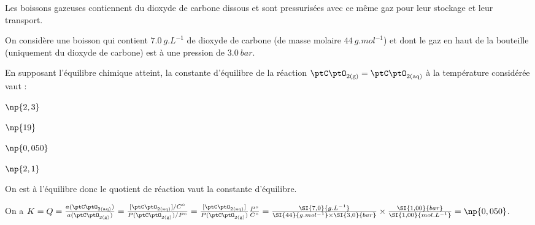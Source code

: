 \newpage



\hauteurLargeurCadreReponse		{8mm}{1.5cm}
\initialisationEntrainement


\debutEntrainement


\begin{enonce}

Les boissons gazeuses contiennent du dioxyde de carbone dissous et sont pressurisées avec ce même gaz pour leur stockage et leur transport. 

On considère une boisson qui contient $\SI{7,0}{g.L^{-1}}$ de dioxyde de carbone (de masse molaire $\SI{44}{g.mol^{-1}}$) et dont le gaz en haut de la bouteille (uniquement du dioxyde de carbone) est à une pression de $\SI{3,0}{bar}$. 

En supposant l'équilibre chimique atteint, la constante d'équilibre de la réaction $\ptC\ptO_{2 \mathrm{(g)}} = \ptC\ptO_{2 \mathrm{(aq)}}$ à la température considérée vaut : 
	
	\begin{listeQCM2Colonnes}
	\item $\np{2,3}$ 
	\item $\np{19}$
	\item $\np{0,050}$
	\item $\np{2,1}$
	\end{listeQCM2Colonnes}

\end{enonce}

\reponse{\reponseC{}}

\begin{corrige}
	On est à l'équilibre donc le quotient de réaction vaut la constante d'équilibre. 
	
	On a 
	$K=Q=
	\frac{a(\ptC\ptO_{2 \mathrm{(aq)}})}
	{a(\ptC\ptO_{2 \mathrm{(g)}})} 
	= 
	\frac{ [\ptC\ptO_{2 \mathrm{(aq)}}] /C^\circ}
	{  P(\ptC\ptO_{2 \mathrm{(g)}})  / P^{\circ}} 
	= 
	\frac{ [\ptC\ptO_{2 \mathrm{(aq)}}] }
	{  P(\ptC\ptO_{2 \mathrm{(g)}})} \frac{ P^{\circ}}{ C^\circ} 
	= \frac{\SI{7,0}{g.L^{-1}}}
	{\SI{44}{g.mol^{-1}} \times \SI{3,0}{bar}}
	 \times \frac{\SI{1,00}{bar}}
	 { \SI{1,00}{mol.L^{-1}}}=\np{0,050}$.
\end{corrige}

